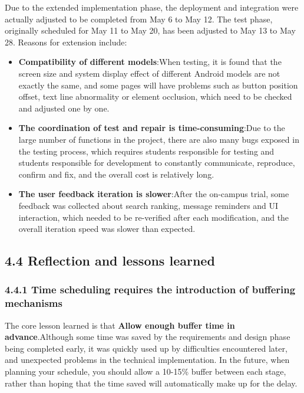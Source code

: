 \documentclass{article}
\begin{document}
Due to the extended implementation phase, the deployment and integration were actually adjusted to be completed from May 6 to May 12. The test phase, originally scheduled for May 11 to May 20, has been adjusted to May 13 to May 28. Reasons for extension include:

\begin{itemize}
    \item \textbf{Compatibility of different models}:When testing, it is found that the screen size and system display effect of different Android models are not exactly the same, and some pages will have problems such as button position offset, text line abnormality or element occlusion, which need to be checked and adjusted one by one.
    \item \textbf{The coordination of test and repair is time-consuming}:Due to the large number of functions in the project, there are also many bugs exposed in the testing process, which requires students responsible for testing and students responsible for development to constantly communicate, reproduce, confirm and fix, and the overall cost is relatively long.
    \item \textbf{The user feedback iteration is slower}:After the on-campus trial, some feedback was collected about search ranking, message reminders and UI interaction, which needed to be re-verified after each modification, and the overall iteration speed was slower than expected.
\end{itemize}

\subsection{4.4 Reflection and lessons learned}

\subsubsection{4.4.1 Time scheduling requires the introduction of buffering mechanisms}

The core lesson learned is that \textbf{Allow enough buffer time in advance}.Although some time was saved by the requirements and design phase being completed early, it was quickly used up by difficulties encountered later, and unexpected problems in the technical implementation. In the future, when planning your schedule, you should allow a 10-15\% buffer between each stage, rather than hoping that the time saved will automatically make up for the delay.
\end{document}
